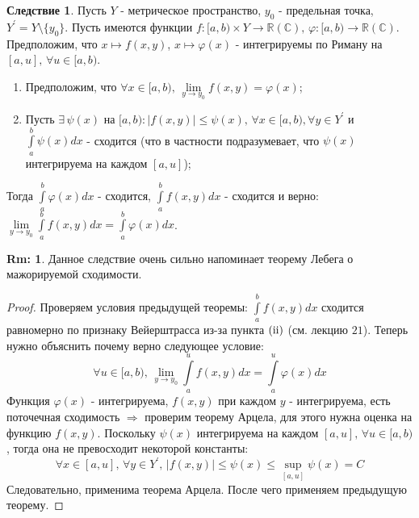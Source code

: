 \documentclass[12pt]{article}
\newcommand{\RN}[1]{%
	\textup{\uppercase\expandafter{\romannumeral#1}}%
}
\newcommand{\MR}{\mathbb{R}}
\newcommand{\MC}{\mathbb{C}}
\theoremstyle{definition}
\newtheorem{rem}{Rm:}
\newtheorem{corollary}{Следствие}
\newcommand{\ddint}[2]{\displaystyle\int\limits_{#1}^{#2}}
\begin{document}
\begin{corollary}
	Пусть $Y$ - метрическое пространство, $y_0$ - предельная точка, $Y^\prime = Y \setminus \{y_0\}$. Пусть имеются функции $f\colon [a,b) \times Y \to \MR(\MC), \, \varphi \colon [a,b) \to \MR (\MC)$. Предположим, что $x \mapsto f(x,y)$, $x \mapsto \varphi(x)$ - интегрируемы по Риману на $[a,u], \, \forall u \in [a,b)$.
	\begin{enumerate}[label=(\Roman*)]
		\item Предположим, что $\forall x \in [a,b), \, \lim\limits_{y\to y_0}f(x,y) =\varphi(x)$;
		\item Пусть $\exists \, \psi(x)$ на $[a,b) \colon |f(x,y)| \leq \psi(x),\, \forall x \in [a,b), \forall y \in Y^\prime$ и $\ddint{a}{b}\psi(x)dx$ - сходится (что в частности подразумевает, что $\psi(x)$ интегрируема на каждом $[a, u]$);
	\end{enumerate}
	Тогда $\ddint{a}{b}\varphi(x)dx$ - сходится, $\ddint{a}{b}f(x,y)dx$ - сходится и верно: $\lim\limits_{y \to y_0}\ddint{a}{b}f(x,y)dx = \ddint{a}{b}\varphi(x)dx$.
\end{corollary}
\begin{rem}
	Данное следствие очень сильно напоминает теорему Лебега о мажорируемой сходимости.
\end{rem}
\begin{proof}
	Проверяем условия предыдущей теоремы: $\ddint{a}{b}f(x,y)dx$ сходится равномерно по признаку Вейерштрасса из-за пункта $(\RN{2})$ (см. лекцию $21$). Теперь нужно объяснить почему верно следующее условие:
	$$
		\forall u \in [a,b), \, \lim\limits_{y \to y_0}\ddint{a}{u}f(x,y)dx = \ddint{a}{u}\varphi(x)dx
	$$
	Функция $\varphi(x)$ - интегрируема, $f(x,y)$ при каждом $y$ - интегрируема, есть поточечная сходимость $\Rightarrow$ проверим теорему Арцела, для этого нужна оценка на функцию $f(x,y)$. Поскольку $\psi(x)$ интегрируема на каждом $[a,u], \, \forall u \in [a,b)$, тогда она не превосходит некоторой константы:
	$$
		\forall x \in [a,u], \, \forall y \in Y^\prime, \, |f(x,y)| \leq \psi(x) \leq \sup\limits_{[a,u]}\psi(x) = C
	$$
	Следовательно, применима теорема Арцела. После чего применяем предыдущую теорему.
\end{proof}
\newpage
\end{document}
